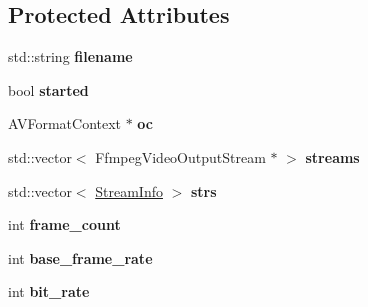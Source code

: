 \subsection*{Protected Attributes}
\begin{DoxyCompactItemize}
\item 
std\+::string {\bfseries filename}\hypertarget{classpangolin_1_1_ffmpeg_video_output_a9515e6e389e494ff801555197c17d076}{}\label{classpangolin_1_1_ffmpeg_video_output_a9515e6e389e494ff801555197c17d076}

\item 
bool {\bfseries started}\hypertarget{classpangolin_1_1_ffmpeg_video_output_a39c337252b41d5680db4606f802b5e70}{}\label{classpangolin_1_1_ffmpeg_video_output_a39c337252b41d5680db4606f802b5e70}

\item 
A\+V\+Format\+Context $\ast$ {\bfseries oc}\hypertarget{classpangolin_1_1_ffmpeg_video_output_a050b84fda7d97afaf6e8d1d727740e01}{}\label{classpangolin_1_1_ffmpeg_video_output_a050b84fda7d97afaf6e8d1d727740e01}

\item 
std\+::vector$<$ Ffmpeg\+Video\+Output\+Stream $\ast$ $>$ {\bfseries streams}\hypertarget{classpangolin_1_1_ffmpeg_video_output_ade3e3ba44877ff9cb9328739794a14ce}{}\label{classpangolin_1_1_ffmpeg_video_output_ade3e3ba44877ff9cb9328739794a14ce}

\item 
std\+::vector$<$ \hyperlink{classpangolin_1_1_stream_info}{Stream\+Info} $>$ {\bfseries strs}\hypertarget{classpangolin_1_1_ffmpeg_video_output_a06f84ddb6046f2658bfab821463a83af}{}\label{classpangolin_1_1_ffmpeg_video_output_a06f84ddb6046f2658bfab821463a83af}

\item 
int {\bfseries frame\+\_\+count}\hypertarget{classpangolin_1_1_ffmpeg_video_output_acda847f4bb1fab562c1b228500e73c21}{}\label{classpangolin_1_1_ffmpeg_video_output_acda847f4bb1fab562c1b228500e73c21}

\item 
int {\bfseries base\+\_\+frame\+\_\+rate}\hypertarget{classpangolin_1_1_ffmpeg_video_output_aa0d397dc329499f9c597d1caeecfcb45}{}\label{classpangolin_1_1_ffmpeg_video_output_aa0d397dc329499f9c597d1caeecfcb45}

\item 
int {\bfseries bit\+\_\+rate}\hypertarget{classpangolin_1_1_ffmpeg_video_output_aebdc068920fdeccef39d8ce2ac768d59}{}\label{classpangolin_1_1_ffmpeg_video_output_aebdc068920fdeccef39d8ce2ac768d59}

\end{DoxyCompactItemize}

